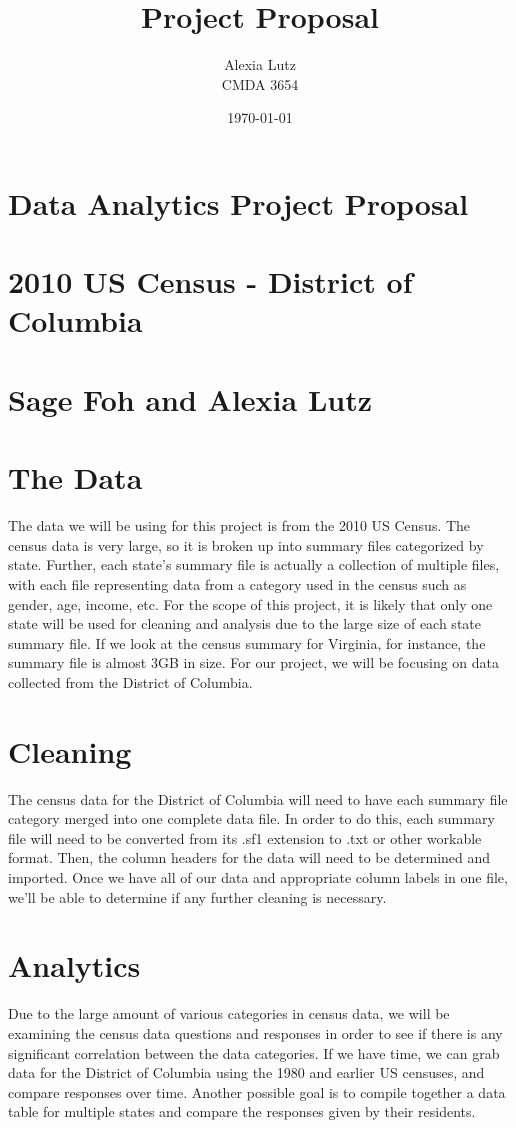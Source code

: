 \documentclass[12pt]{article}
\title{Project Proposal}
\author{Alexia Lutz\\CMDA 3654}
\date{\today}
\begin{document}
\begin{center}
\section*{Data Analytics Project Proposal}
\section*{2010 US Census - District of Columbia}
\section*{Sage Foh and Alexia Lutz}
\end{center}

\section*{The Data}
The data we will be using for this project is from the 2010 US Census. The census data is very large, so it is broken up into summary files categorized by state. Further, each state's summary file is actually a collection of multiple files, with each file representing data from a category used in the census such as gender, age, income, etc. For the scope of this project, it is likely that only one state will be used for cleaning and analysis due to the large size of each state summary file. If we look at the census summary for Virginia, for instance, the summary file is almost 3GB in size. For our project, we will be focusing on data collected from the District of Columbia. 

\section*{Cleaning}
The census data for the District of Columbia will need to have each summary file category merged into one complete data file. In order to do this, each summary file will need to be converted from its .sf1 extension to .txt or other workable format. Then, the column headers for the data will need to be determined and imported. Once we have all of our data and appropriate column labels in one file, we'll be able to determine if any further cleaning is necessary. 

\section*{Analytics}
Due to the large amount of various categories in census data, we will be examining the census data questions and responses in order to see if there is any significant correlation between the data categories. If we have time, we can grab data for the District of Columbia using the 1980 and earlier US censuses, and compare responses over time. Another possible goal is to compile together a data table for multiple states and compare the responses given by their residents.
\end{document}
